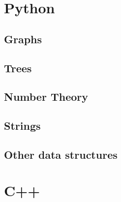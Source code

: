 \documentclass[answers]{exam}
\newcommand{\mytitle}{~}
\newcommand{\myauthor}{Martin Opat}
\begin{document}
        
        
            

\tableofcontents \newpage

\section{Python}
\subsection{Graphs}
\subsection{Trees}
\subsection{Number Theory}
\subsection{Strings}
\subsection{Other data structures}


\section{C++}
\end{document}
